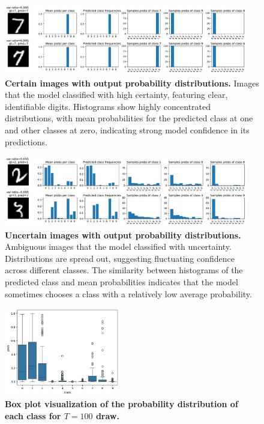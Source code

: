 \begin{figure}[H]
    \centering
    \includegraphics[width=0.95\textwidth]{var-ratio_certain_images.pdf}
    \caption{\textbf{Certain images with output probability distributions.} Images that the model classified with high certainty, featuring clear, identifiable digits. Histograms show highly concentrated distributions, with mean probabilities for the predicted class at one and other classes at zero, indicating strong model confidence in its predictions.}
    \label{fig:varratio_certain}
\end{figure}
\begin{figure}[H]
    \centering
    \includegraphics[width=0.95\textwidth]{var-ratio_uncertain_images.pdf}
    \caption{\textbf{Uncertain images with output probability distributions.} Ambiguous images that the model classified with uncertainty. Distributions are spread out, suggesting fluctuating confidence across different classes. The similarity between histograms of the predicted class and mean probabilities indicates that the model sometimes chooses a class with a relatively low average probability.}
    \label{fig:varratio_uncertain}
\end{figure}
\begin{figure}[H]
    \centering
    \includegraphics[width=0.45\textwidth]{proba_barplot.png}
    \caption{\textbf{Box plot visualization of the probability distribution of each class for $ T=100 $ draw.}}
    \label{fig:proba_barplot}
\end{figure}

